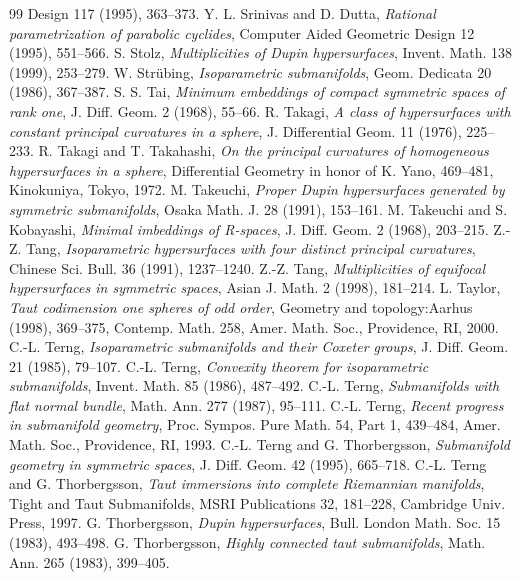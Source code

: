 \documentclass[12pt]{article}
\begin{document}
{\begin{thebibliography}{99}
Design 117 (1995), 363--373.
 Y. L. Srinivas and D. Dutta,
{\em Rational parametrization of parabolic cyclides}, Computer
Aided Geometric Design 12 (1995), 551--566.
S. Stolz, {\em Multiplicities of Dupin hypersurfaces},
Invent. Math.  138 (1999), 253--279.
 W. Str\"{u}bing, {\em Isoparametric submanifolds},
Geom. Dedicata 20 (1986), 367--387.
 S. S. Tai, {\em Minimum embeddings of compact
symmetric spaces of rank one}, J. Diff. Geom. 2 (1968), 55--66.
 R. Takagi, {\em A class of hypersurfaces with constant principal
curvatures in a sphere}, J. Differential Geom.  11 (1976), 225--233.
R. Takagi and T. Takahashi, {\em On the principal
curvatures of homogeneous hypersurfaces in a sphere}, Differential
Geometry in honor of K. Yano, 469--481, Kinokuniya, Tokyo, 1972.
 M. Takeuchi, {\em Proper Dupin hypersurfaces
generated by symmetric submanifolds}, Osaka Math. J. 28 (1991), 153--161.
 M. Takeuchi and S. Kobayashi, {\em Minimal imbeddings
of R-spaces}, J. Diff. Geom. 2 (1968), 203--215.
 Z.-Z. Tang, {\em Isoparametric hypersurfaces
with four distinct principal curvatures}, Chinese Sci. Bull. 36
(1991), 1237--1240.
 Z.-Z. Tang, {\em Multiplicities of equifocal hypersurfaces in symmetric spaces}, 
Asian J. Math. 2 (1998), 181--214.
 L. Taylor, {\em Taut codimension one spheres of odd order}, Geometry and topology:Aarhus (1998), 369--375, Contemp. Math. 258, Amer. Math. Soc., Providence, RI, 2000. 
C.-L. Terng, {\em Isoparametric submanifolds and their
Coxeter groups}, J. Diff. Geom. 21 (1985), 79--107.
 C.-L. Terng, {\em Convexity theorem
for isoparametric submanifolds}, Invent. Math. 85 (1986), 487--492.
 C.-L. Terng, {\em Submanifolds with
flat normal bundle}, Math. Ann. 277 (1987), 95--111.
 C.-L. Terng, {\em Recent progress in
submanifold geometry}, Proc. Sympos. Pure Math. 54, Part 1, 439--484,
Amer. Math. Soc., Providence, RI, 1993.
C.-L. Terng and G. Thorbergsson, {\em Submanifold
geometry in symmetric spaces}, J. Diff. Geom. 42 (1995), 665--718.
 C.-L. Terng and G. Thorbergsson, {\em Taut immersions
into complete Riemannian manifolds}, Tight and Taut Submanifolds, MSRI
Publications 32, 181--228, Cambridge Univ. Press, 1997. 
G. Thorbergsson, {\em Dupin hypersurfaces}, Bull.
London Math. Soc. 15 (1983), 493--498.
 G. Thorbergsson, {\em Highly connected
taut submanifolds}, Math. Ann. 265 (1983), 399--405.

\end{thebibliography}}
\end{document}
